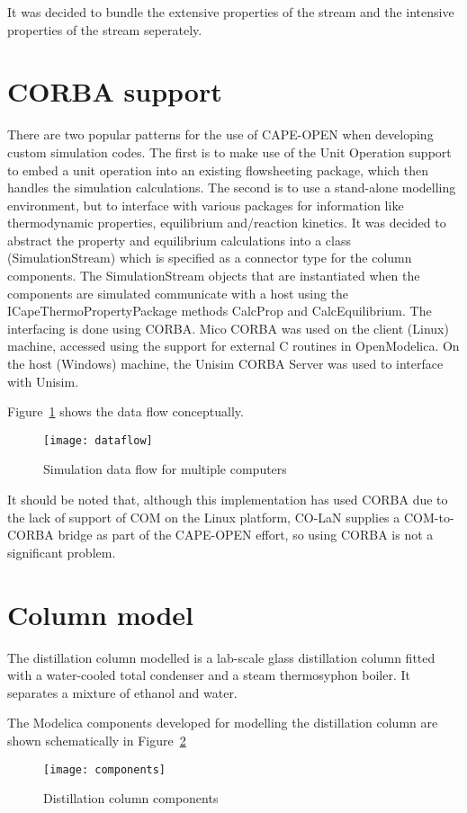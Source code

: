 It was decided to bundle the extensive properties of the stream and the intensive properties of the stream seperately.

\section{CORBA support}
There are two popular patterns for the use of CAPE-OPEN when developing custom simulation codes.  
The first is to make use of the Unit Operation support to embed a unit operation into an existing flowsheeting package, which then handles the simulation calculations. 
The second is to use a stand-alone modelling environment, but to interface with various packages for information like thermodynamic properties, equilibrium and/reaction kinetics.  
It was decided to abstract the property and equilibrium calculations into a class (SimulationStream) which is specified as a connector type for the column components.  
The SimulationStream objects that are instantiated when the components are simulated communicate with a host using the ICapeThermoPropertyPackage methods CalcProp and CalcEquilibrium.  
The interfacing is done using CORBA.  
Mico CORBA was used on the client (Linux) machine, accessed using the support for external C routines in OpenModelica.  
On the host (Windows) machine, the Unisim CORBA Server was used to interface with Unisim.

Figure~\ref{fig:dataflow} shows the data flow conceptually.
\begin{figure}[htbp]
  \centering
  \texttt{[image: dataflow]}
  \caption{Simulation data flow for multiple computers}
  \label{fig:dataflow}
\end{figure}

It should be noted that, although this implementation has used CORBA due to the lack of support of COM on the Linux platform, CO-LaN supplies a COM-to-CORBA bridge as part of the CAPE-OPEN effort, so using CORBA is not a significant problem.

\section{Column model}
\label{sec:column-model} 
The distillation column modelled is a lab-scale glass distillation column fitted with a water-cooled total condenser and a steam thermosyphon boiler.  
It separates a mixture of ethanol and water.

The Modelica components developed for modelling the distillation column are shown schematically in Figure~\ref{fig:components}
\begin{figure}[htbp]
  \centering
  \texttt{[image: components]}
  \caption{Distillation column components}
  \label{fig:components}
\end{figure}

